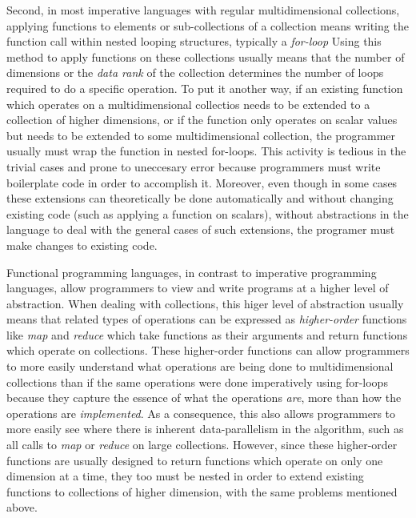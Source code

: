 Second, in most imperative languages with regular multidimensional collections, applying functions to elements or sub-collections of a collection means writing the function call within nested looping structures, typically a \textit{for-loop}
Using this method to apply functions on these collections usually means that the number of dimensions or the \textit{data rank} of the collection determines the number of loops required to do a specific operation.
To put it another way, if an existing function which operates on a multidimensional collectios needs to be extended to a collection of higher dimensions, 
or if the function only operates on scalar values but needs to be extended to some multidimensional collection, 
the programmer usually must wrap the function in nested for-loops.
This activity is tedious in the trivial cases and prone to uneccesary error because programmers must write boilerplate code in order to accomplish it.
Moreover, even though in some cases these extensions can theoretically be done automatically and without changing existing code (such as applying a function on scalars), 
without abstractions in the language to deal with the general cases of such extensions, the programer must make changes to existing code.

Functional programming languages, in contrast to imperative programming languages, allow programmers to view and write programs at a higher level of abstraction.
When dealing with collections, this higer level of abstraction usually means that related types of operations can be expressed as \textit{higher-order} functions 
like \textit{map} and \textit{reduce} which take functions as their arguments and return functions which operate on collections.
These higher-order functions can allow programmers to more easily understand what operations are being done to multidimensional collections 
than if the same operations were done imperatively using for-loops 
because they capture the essence of what the operations \textit{are}, more than how the operations are \textit{implemented}.
As a consequence, this also allows programmers to more easily see where there is inherent data-parallelism in the algorithm, such as all calls to \textit{map} or \textit{reduce} on large collections.
However, since these higher-order functions are usually designed to return functions which operate on only one dimension at a time, 
they too must be nested in order to extend existing functions to collections of higher dimension, with the same problems mentioned above.

